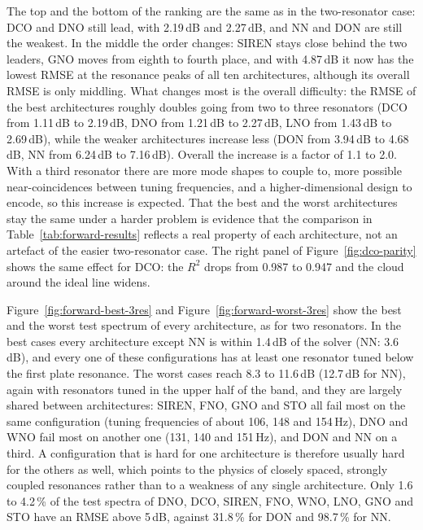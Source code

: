 The top and the bottom of the ranking are the same as in the two-resonator case: DCO and DNO still lead, with 2.19\,dB and 2.27\,dB, and NN and DON are still the weakest. In the middle the order changes: SIREN stays close behind the two leaders, GNO moves from eighth to fourth place, and with 4.87\,dB it now has the lowest RMSE at the resonance peaks of all ten architectures, although its overall RMSE is only middling. What changes most is the overall difficulty: the RMSE of the best architectures roughly doubles going from two to three resonators (DCO from 1.11\,dB to 2.19\,dB, DNO from 1.21\,dB to 2.27\,dB, LNO from 1.43\,dB to 2.69\,dB), while the weaker architectures increase less (DON from 3.94\,dB to 4.68\,dB, NN from 6.24\,dB to 7.16\,dB). Overall the increase is a factor of 1.1 to 2.0. With a third resonator there are more mode shapes to couple to, more possible near-coincidences between tuning frequencies, and a higher-dimensional design to encode, so this increase is expected. That the best and the worst architectures stay the same under a harder problem is evidence that the comparison in Table~\ref{tab:forward-results} reflects a real property of each architecture, not an artefact of the easier two-resonator case. The right panel of Figure~\ref{fig:dco-parity} shows the same effect for DCO: the $R^2$ drops from 0.987 to 0.947 and the cloud around the ideal line widens.

Figure~\ref{fig:forward-best-3res} and Figure~\ref{fig:forward-worst-3res} show the best and the worst test spectrum of every architecture, as for two resonators. In the best cases every architecture except NN is within 1.4\,dB of the solver (NN: 3.6\,dB), and every one of these configurations has at least one resonator tuned below the first plate resonance. The worst cases reach 8.3 to 11.6\,dB (12.7\,dB for NN), again with resonators tuned in the upper half of the band, and they are largely shared between architectures: SIREN, FNO, GNO and STO all fail most on the same configuration (tuning frequencies of about 106, 148 and 154\,Hz), DNO and WNO fail most on another one (131, 140 and 151\,Hz), and DON and NN on a third. A configuration that is hard for one architecture is therefore usually hard for the others as well, which points to the physics of closely spaced, strongly coupled resonances rather than to a weakness of any single architecture. Only 1.6 to 4.2\,\% of the test spectra of DNO, DCO, SIREN, FNO, WNO, LNO, GNO and STO have an RMSE above 5\,dB, against 31.8\,\% for DON and 98.7\,\% for NN.

